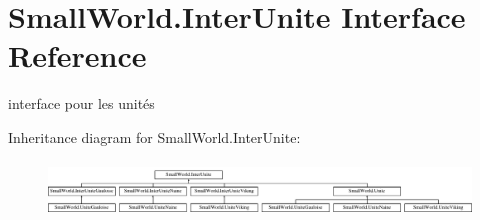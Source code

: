 \hypertarget{interface_small_world_1_1_inter_unite}{\section{Small\-World.\-Inter\-Unite Interface Reference}
\label{interface_small_world_1_1_inter_unite}
}


interface pour les unités  


Inheritance diagram for Small\-World.\-Inter\-Unite\-:\begin{figure}[H]
\begin{center}
\leavevmode
\includegraphics[height=1.481482cm]{interface_small_world_1_1_inter_unite}
\end{center}
\end{figure}
